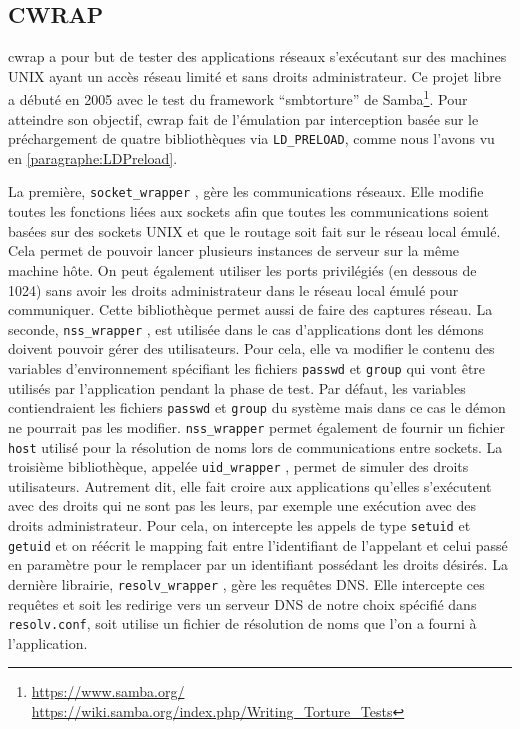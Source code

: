 \subsection{CWRAP}
\label{subsection:cwrap}

cwrap\citep{cwrap, cwrap_bis} a pour but de tester des applications réseaux
s'exécutant sur des machines UNIX ayant un accès réseau limité et sans droits
administrateur. Ce projet libre a débuté en 2005 avec le test du framework
``smbtorture'' de Samba\footnote{\url{https://www.samba.org/}
  \\ \url{https://wiki.samba.org/index.php/Writing\_Torture\_Tests}}. Pour
atteindre son objectif, cwrap fait de l'émulation par interception basée sur le
préchargement de quatre bibliothèques via \texttt{LD\_PRELOAD}, comme nous
l'avons vu en \ref{paragraphe:LDPreload}.

La première, \texttt{socket\_wrapper} \citep{cwrap}, gère les communications
réseaux. Elle modifie toutes les fonctions liées aux sockets afin que toutes les
communications soient basées sur des sockets UNIX et que le routage soit fait
sur le réseau local émulé. Cela permet de pouvoir lancer plusieurs instances de
serveur sur la même machine hôte. On peut également utiliser les ports
privilégiés (en dessous de 1024) sans avoir les droits administrateur dans le
réseau local émulé pour communiquer. Cette bibliothèque permet aussi de faire
des captures réseau. La seconde, \texttt{nss\_wrapper} \citep{cwrap}, est
utilisée dans le cas d'applications dont les démons doivent pouvoir gérer des
utilisateurs. Pour cela, elle va modifier le contenu des variables
d'environnement spécifiant les fichiers \texttt{passwd} et \texttt{group} qui
vont être utilisés par l'application pendant la phase de test. Par défaut, les
variables contiendraient les fichiers \texttt{passwd} et \texttt{group} du
système mais dans ce cas le démon ne pourrait pas les
modifier. \texttt{nss\_wrapper} permet également de fournir un fichier
\texttt{host} utilisé pour la résolution de noms lors de communications entre
sockets. La troisième bibliothèque, appelée \texttt{uid\_wrapper} \citep{cwrap},
permet de simuler des droits utilisateurs. Autrement dit, elle fait croire aux
applications qu'elles s'exécutent avec des droits qui ne sont pas les leurs, par
exemple une exécution avec des droits administrateur. Pour cela, on intercepte
les appels de type \texttt{setuid} et \texttt{getuid} et on réécrit le mapping
fait entre l'identifiant de l'appelant et celui passé en paramètre pour le
remplacer par un identifiant possédant les droits désirés. La dernière
librairie, \texttt{resolv\_wrapper} \citep{cwrap}, gère les requêtes DNS. Elle
intercepte ces requêtes et soit les redirige vers un serveur DNS de notre choix
spécifié dans \texttt{resolv.conf}, soit utilise un fichier de résolution de
noms que l'on a fourni à l'application.

